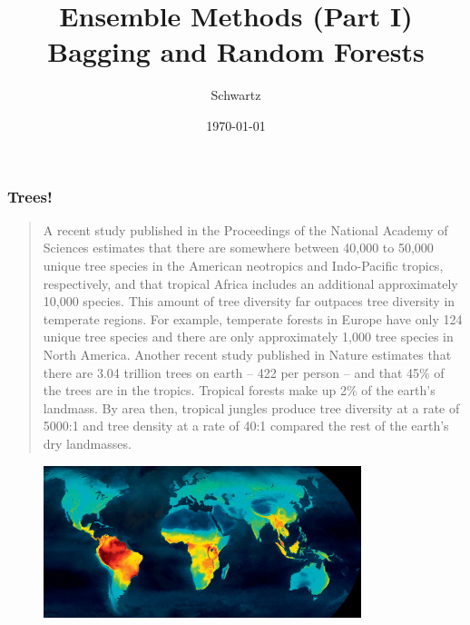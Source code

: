 \documentclass[xcolor={dvipsnames}]{beamer}
\title{Ensemble Methods (Part I)\\
Bagging and Random Forests}
\author{Schwartz}
\date{\today}
\begin{document}
\frame{\titlepage}




\frame
{
 \frametitle{Trees!}
 
{
\selectfont
\begin{quote}
\tiny
\justify
A recent study published in the Proceedings of the National Academy of Sciences estimates that there are somewhere between 40,000 to 50,000 unique tree species in the American neotropics and Indo-Pacific tropics, respectively, and that tropical Africa includes an additional approximately 10,000 species. This amount of tree diversity far outpaces tree diversity in temperate regions. For example, temperate forests in Europe have only 124 unique tree species and there are only approximately 1,000 tree species in North America.  
Another recent study published in Nature estimates that there are 3.04 trillion trees on earth -- 422 per person -- and that 45\% of the trees are in the tropics.  Tropical forests make up 2\% of the earth's landmass. By area then, tropical jungles produce tree diversity at a rate of 5000:1 and tree density at a rate of 40:1 compared the rest of the earth's dry landmasses. 
\end{quote}
}

\begin{figure}
\centering
\includegraphics[width=3.65in]{stuffs/biodiversity.jpg}
\end{figure}

}
\end{document}
